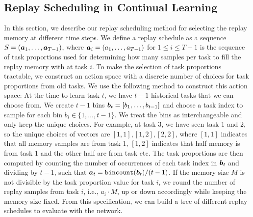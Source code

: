 

\subsection{Replay Scheduling in Continual Learning}\label{paperC:sec:replay_scheduling_in_continual_learning}

In this section, 
we describe our replay scheduling method for selecting the replay memory at different time steps. We define a replay schedule as a sequence $S = ({\bm{a}}_1, \dots, {\bm{a}}_{T-1})$, where ${\bm{a}}_i = (a_1, \dots, a_{T-1})$ for $1 \leq i \leq T-1$ is the sequence of task proportions used for determining how many samples per task to fill the replay memory with at task $i$. To make the selection of task proportions tractable, we construct an action space with a discrete number of choices for %
task proportions from old tasks. 
We use the following method to construct this action space: At the time to learn task $t$, we have $t-1$ historical tasks that we can choose from. We create $t-1$ bins ${\bm{b}}_t = [b_1, \dots, b_{t-1}]$ and choose a task index to sample for each bin $b_i \in \{1, \dots, t-1 \}$. We treat the bins as interchangeable and only keep the unique choices. 
For example, at task 3, we have seen task 1 and 2, so the unique choices of vectors are $[1,1], [1,2], [2,2]$, where $[1,1]$ indicates that all memory samples are from task 1, $[1,2]$ indicates that half memory is from task 1 and the other half are from task etc. The task proportions are then computed by counting the number of occurrences of each task index in ${\bm{b}}_t$ and dividing by $t-1$, such that ${\bm{a}}_t = \texttt{bincount}({\bm{b}}_t) / (t-1)$. 
If the memory size $M$ is not divisible by the task proportion value for task $i$, we round the number of replay samples from task $i$, i.e., $a_i \cdot M$, up or down accordingly while keeping the memory size fixed.
From this specification, we can build a tree of different replay schedules to evaluate with the network.


